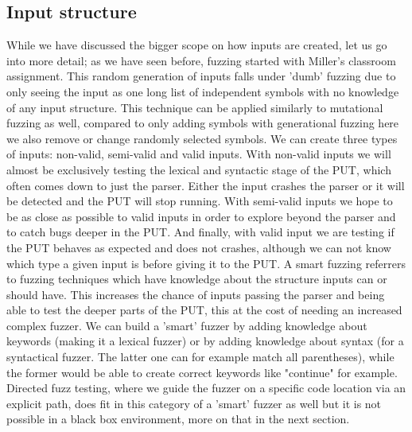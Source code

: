 \subsection{Input structure}
\label{fuzzing:InputStructure}
While we have discussed the bigger scope on how inputs are created, let us go into more detail; as we have seen before, fuzzing started with Miller's classroom assignment. This random generation of inputs falls under 'dumb' fuzzing due to only seeing the input as one long list of independent symbols with no knowledge of any input structure. This technique can be applied similarly to mutational fuzzing as well, compared to only adding symbols with generational fuzzing here we also remove or change randomly selected symbols. 
We can create three types of inputs: non-valid, semi-valid and valid inputs. With non-valid inputs we will almost be exclusively testing the lexical and syntactic stage of the PUT, which often comes down to just the parser. Either the input crashes the parser or it will be detected and the PUT will stop running. With semi-valid inputs we hope to be as close as possible to valid inputs in order to explore beyond the parser and to catch bugs deeper in the PUT. And finally, with valid input we are testing if the PUT behaves as expected and does not crashes, although we can not know which type a given input is before giving it to the PUT.
A smart fuzzing referrers to fuzzing techniques which have knowledge about the structure inputs can or should have. This increases the chance of inputs passing the parser and being able to test the deeper parts of the PUT, this at the cost of needing an increased complex fuzzer. We can build a 'smart' fuzzer by adding knowledge about keywords (making it a lexical fuzzer) or by adding knowledge about syntax (for a syntactical fuzzer. The latter one can for example match all parentheses), while the former would be able to create correct keywords like "continue" for example. Directed fuzz testing, where we guide the fuzzer on a specific code location via an explicit path, does fit in this category of a 'smart' fuzzer as well but it is not possible in a black box environment, more on that in the next section.

